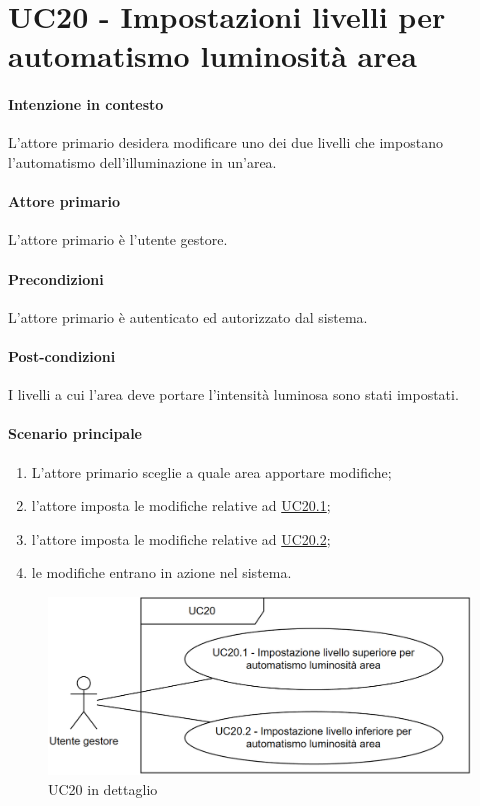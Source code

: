 \section{UC20 - Impostazioni livelli per automatismo luminosità area}\label{uc:20}
\paragraph{Intenzione in contesto} L'attore primario desidera modificare uno dei due livelli che impostano l'automatismo dell'illuminazione in un'area. 

\paragraph{Attore primario} L'attore primario è l'utente gestore.
\paragraph{Precondizioni} L'attore primario è autenticato ed autorizzato dal sistema.
\paragraph{Post-condizioni} I livelli a cui l'area deve portare l'intensità luminosa sono stati impostati.
\paragraph{Scenario principale}
\begin{enumerate}
    \item L'attore primario sceglie a quale area apportare modifiche;
    \item l'attore imposta le modifiche relative ad \hyperref[uc:20.1]{UC20.1};
    \item l'attore imposta le modifiche relative ad \hyperref[uc:20.2]{UC20.2};
    \item le modifiche entrano in azione nel sistema. 
\end{enumerate}

\begin{figure}[h]
    \includegraphics[width=\textwidth]{contenuti/img/casi_uso_grafici-uc20.png}
    \caption{UC20 in dettaglio}
    \label{fig:uc20}
\end{figure}

